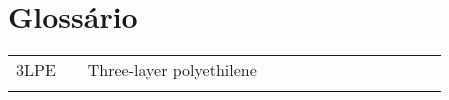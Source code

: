 \chapter*{Glossário}

\noindent
\begin{longtable}{l l p{0.86\linewidth}}

3LPE 	&   & Three-layer polyethilene \\\\

\end{longtable}

